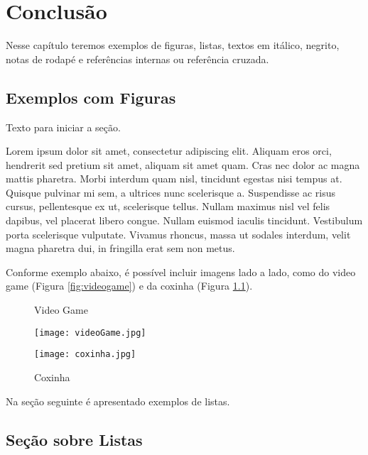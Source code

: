 \chapter{Conclusão}

Nesse capítulo teremos exemplos de figuras, listas, textos em itálico, negrito, notas de rodapé e referências internas ou referência cruzada. 

\section{Exemplos com Figuras}

Texto para iniciar a seção.

Lorem ipsum dolor sit amet, consectetur adipiscing elit. Aliquam eros orci, hendrerit sed pretium sit amet, aliquam sit amet quam. Cras nec dolor ac magna mattis pharetra. Morbi interdum quam nisl, tincidunt egestas nisi tempus at. Quisque pulvinar mi sem, a ultrices nunc scelerisque a. Suspendisse ac risus cursus, pellentesque ex ut, scelerisque tellus. Nullam maximus nisl vel felis dapibus, vel placerat libero congue. Nullam euismod iaculis tincidunt. Vestibulum porta scelerisque vulputate. Vivamus rhoncus, massa ut sodales interdum, velit magna pharetra dui, in fringilla erat sem non metus. 

Conforme exemplo abaixo, é possível incluir imagens lado a lado, como do video game (Figura \ref{fig:videogame}) e da coxinha (Figura \ref{fig:coxinha}).

\begin{figure}[H]
	\centering
	\begin{minipage}[t]{0.45\linewidth}
		\centering
		\caption{Video Game}
		\texttt{[image: videoGame.jpg]}
		\label{fig:videogame}
	\end{minipage}
	\hspace{0.2cm}
	\begin{minipage}[t]{0.45\linewidth}
		\centering
		\caption{Coxinha}
		\texttt{[image: coxinha.jpg]}
		\label{fig:coxinha}
	\end{minipage}
\end{figure}

Na seção seguinte é apresentado exemplos de listas.


\section{Seção sobre Listas}

